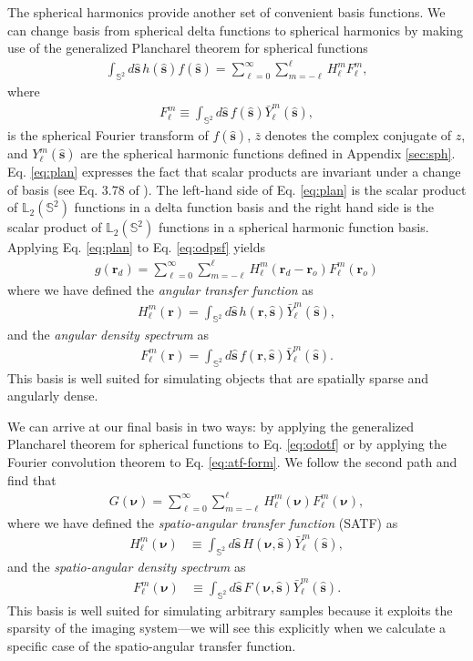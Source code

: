 \documentclass{osa-article}
\providecommand{\mb}[1]{\mathbf{#1}}
\providecommand{\ro}{\mathbf{\mathbf{r}}_o}
\providecommand{\rd}{\mathbf{r}_d}
\providecommand{\mh}[1]{\mathbf{\hat{#1}}}
\providecommand{\mbb}[1]{\mathbb{#1}}
\providecommand{\bs}[1]{\boldsymbol{#1}}
\providecommand{\lmsum}{\sum_{\ell=0}^\infty\sum_{m=-\ell}^{\ell}}
\providecommand{\ints}[1]{\int_{\mbb{S}^{#1}}}
\begin{document}
  The spherical harmonics provide another set of convenient basis functions. We
  can change basis from spherical delta functions to spherical harmonics by
  making use of the generalized Plancharel theorem for spherical functions
\begin{align}
  \ints{2}d\mh{s}{}\, h(\mh{s})f(\mh{s}) = \lmsum H_\ell^m F_\ell^m, \label{eq:plan}
\end{align}
where
\begin{align}
  F_\ell^m \equiv \int_{\mbb{S}^2}d\mh{s}\, f(\mh{s})\bar{Y}_\ell^m(\mh{s}), 
\end{align}
is the spherical Fourier transform of $f(\mh{s})$, $\bar{z}$ denotes the complex
conjugate of $z$, and $Y_{\ell}^m(\mh{s})$ are the spherical harmonic functions
defined in Appendix \ref{sec:sph}. Eq. \ref{eq:plan} expresses the fact that
scalar products are invariant under a change of basis (see Eq. 3.78 of
\cite{barrett2004}). The left-hand side of Eq. \ref{eq:plan} is the scalar
product of $\mbb{L}_2(\mbb{S}^2)$ functions in a delta function basis and the
right hand side is the scalar product of $\mbb{L}_2(\mbb{S}^2)$ functions in a
spherical harmonic function basis. Applying Eq. \ref{eq:plan} to Eq.
\ref{eq:odpsf} yields
\begin{align}
  g(\rd) = \lmsum H_\ell^m(\rd - \ro)F_\ell^m(\ro) \label{eq:atf-form}
\end{align}
where we have defined the \textit{angular transfer function} as
\begin{align}
  H_\ell^m(\mb{r}) = \int_{\mbb{S}^2}d\mh{s}\, h(\mb{r}, \mh{s})\bar{Y}_{\ell}^m(\mh{s}),\label{eq:atf-prep} 
\end{align}
and the \textit{angular density spectrum} as
\begin{align}
  F_\ell^m(\mb{r}) = \int_{\mbb{S}^2}d\mh{s}\, f(\mb{r}, \mh{s})\bar{Y}_{\ell}^m(\mh{s}).
\end{align}
This basis is well suited for simulating objects that are spatially sparse and
angularly dense.

We can arrive at our final basis in two ways: by applying the generalized
Plancharel theorem for spherical functions to Eq. \ref{eq:odotf} or by applying
the Fourier convolution theorem to Eq. \ref{eq:atf-form}. We follow the
second path and find that
\begin{align}
G(\bs{\nu}) = \lmsum H_\ell^m(\bs{\nu})F_\ell^m(\bs{\nu}) \label{eq:saft},
\end{align}
where we have defined the \textit{spatio-angular transfer function} (SATF) as
  \begin{align}
  H_\ell^m(\bs{\nu}) &\equiv \int_{\mbb{S}^2}d\mh{s}\, H(\bs{\nu}, \mh{s})\bar{Y}_\ell^m(\mh{s}),
  \end{align}
  and the \textit{spatio-angular density spectrum} as
  \begin{align}
  F_\ell^m(\bs{\nu}) &\equiv \int_{\mbb{S}^2}d\mh{s}\, F(\bs{\nu}, \mh{s})\bar{Y}_\ell^m(\mh{s}).
  \end{align}
  This basis is well suited for simulating arbitrary samples because it exploits
  the sparsity of the imaging system---we will see this explicitly when we
  calculate a specific case of the spatio-angular transfer function.
\end{document}
